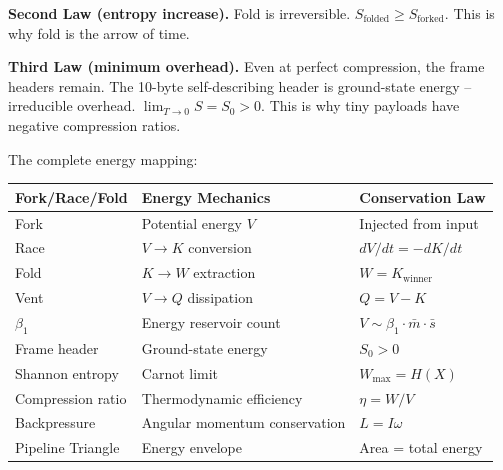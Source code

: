 \documentclass[
  11pt,
]{article}
\newcounter{none} %
\begin{document}
\textbf{Second Law (entropy increase).} Fold is irreversible.
\(S_{\text{folded}} \geq S_{\text{forked}}\). This is why fold is the
arrow of time.

\textbf{Third Law (minimum overhead).} Even at perfect compression, the
frame headers remain. The 10-byte self-describing header is ground-state
energy -- irreducible overhead. \(\lim_{T \to 0} S = S_0 > 0\). This is
why tiny payloads have negative compression ratios.

The complete energy mapping:

{\def\LTcaptype{none} %
\begin{longtable}[]{@{}
  >{\raggedright\arraybackslash}p{}
  >{\raggedright\arraybackslash}p{}
  >{\raggedright\arraybackslash}p{}@{}}
\toprule\noalign{}
\begin{minipage}[b]{\linewidth}\raggedright
Fork/Race/Fold
\end{minipage} & \begin{minipage}[b]{\linewidth}\raggedright
Energy Mechanics
\end{minipage} & \begin{minipage}[b]{\linewidth}\raggedright
Conservation Law
\end{minipage} \\
\midrule\noalign{}
\endhead
\bottomrule\noalign{}
\endlastfoot
Fork & Potential energy \(V\) & Injected from input \\
Race & \(V \to K\) conversion & \(dV/dt = -dK/dt\) \\
Fold & \(K \to W\) extraction & \(W = K_{\text{winner}}\) \\
Vent & \(V \to Q\) dissipation & \(Q = V - K\) \\
\(\beta_1\) & Energy reservoir count &
\(V \sim \beta_1 \cdot \bar{m} \cdot \bar{s}\) \\
Frame header & Ground-state energy & \(S_0 > 0\) \\
Shannon entropy & Carnot limit & \(W_{\max} = H(X)\) \\
Compression ratio & Thermodynamic efficiency & \(\eta = W/V\) \\
Backpressure & Angular momentum conservation & \(L = I\omega\) \\
Pipeline Triangle & Energy envelope & Area = total energy \\
\end{longtable}
}
\end{document}

